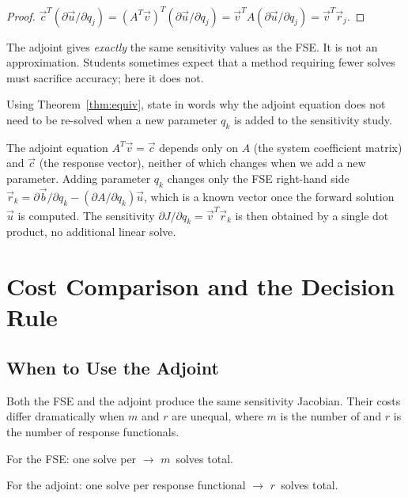 \begin{proof}
$\vec{c}^T(\partial\vec{u}/\partial q_j)
= (A^T\vec{v})^T(\partial\vec{u}/\partial q_j)
= \vec{v}^T A(\partial\vec{u}/\partial q_j)
= \vec{v}^T\vec{r}_j$.
\end{proof}

The adjoint gives \emph{exactly} the same sensitivity values as
the FSE. It is not an approximation. Students sometimes expect that
a method requiring fewer solves must sacrifice accuracy;
here it does not.

\begin{selfcheck}
Using Theorem~\ref{thm:equiv}, state in words why the adjoint
equation does not need to be re-solved when a new parameter $q_k$
is added to the sensitivity study.
\end{selfcheck}
\begin{scAnswer}
The adjoint equation $A^T\vec{v} = \vec{c}$ depends only on
$A$ (the system coefficient matrix) and $\vec{c}$ (the response
vector), neither of which changes when we add a new parameter.
Adding parameter $q_k$ changes only the FSE right-hand side
$\vec{r}_k = \partial\vec{b}/\partial q_k - (\partial A/\partial q_k)\vec{u}$,
which is a known vector once the forward solution $\vec{u}$ is computed.
The sensitivity $\partial J/\partial q_k = \vec{v}^T\vec{r}_k$
is then obtained by a single dot product, no additional linear solve.
\end{scAnswer}

\section{Cost Comparison and the Decision Rule}
\label{sec:adjcost}

\subsection{When to Use the Adjoint}

Both the FSE and the adjoint produce the same sensitivity Jacobian.
Their costs differ dramatically when $m$ and $r$ are unequal,
where $m$ is the number of \POIs and $r$ is the number of
response functionals.

For the FSE: one solve per \POI $\to$ $m$~solves total.

For the adjoint: one solve per response functional $\to$ $r$~solves total.

